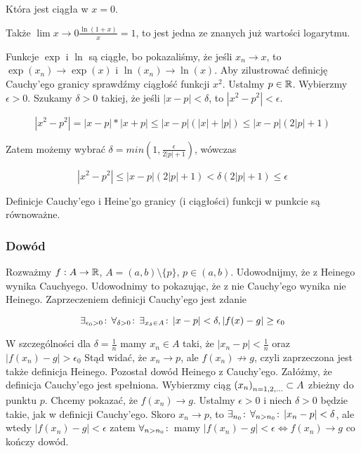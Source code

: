 \documentclass[9pt]{article}
\begin{document}
Która jest ciągła w $x = 0$.

\bigbreak

Także $\lim{x \to 0} \frac{\ln(1 + x)}{x} = 1$, to jest jedna ze znanych już wartości logarytmu.

\bigbreak

Funkcje $\exp$ i $\ln$ są ciągłe, bo pokazaliśmy, że jeśli $x_n \to x$, to $\exp(x_n) \to \exp(x)$ i
$\ln(x_n) \to \ln(x)$. Aby zilustrować definicję Cauchy'ego granicy sprawdźmy ciągłość funkcji
$x^2$. Ustalmy $p \in \mathbb{R}$. Wybierzmy $\epsilon > 0$. Szukamy $\delta > 0$ takiej, że jeśli $|x-p| <
\delta$, to $|x^2 - p^2| < \epsilon$.

\[
    |x^2 - p^2| = |x - p| * |x + p| \le |x-p| \left(|x| + |p|\right) \le |x-p| \left(2|p| + 1\right)
\]

Zatem możemy wybrać $\delta = min (1, \frac{\epsilon}{2|p| + 1})$, wówczas

\[
    |x^2 - p^2| \le |x-p|(2|p| + 1) < \delta(2|p| + 1) \le \epsilon
\]

\begin{Twi}
    Definicje Cauchy'ego i Heine'go granicy (i ciągłości) funkcji w punkcie są równoważne.
\end{Twi}

\subsubsection*{Dowód}

Rozważmy $f: A \to \mathbb{R}$, $A = (a, b) \setminus \{p\}$, $p \in (a,b)$. Udowodnijmy, że z Heinego wynika
Cauchyego. Udowodnimy to pokazując, że z nie Cauchy'ego wynika nie Heinego. Zaprzeczeniem definicji
Cauchy'ego jest zdanie

\[
    \exists_{\epsilon_0 > 0} \! : \, \forall_{\delta > 0} \! : \, \exists_{x_\delta \in A} \! : \, |x-p| < \delta, |f(x) - g| \ge
    \epsilon_0
\]

W szczególności dla $\delta = \frac{1}{n}$ mamy $x_n \in A$ taki, że $|x_n - p| < \frac{1}{n}$ oraz
$|f(x_n) - g| > \epsilon_0$ Stąd widać, że $x_n \to p$, ale $f(x_n) \not\to g$, czyli zaprzeczona
jest także definicja Heinego. Pozostał dowód Heinego z Cauchy'ego. Załóżmy, że definicja Cauchy'ego
jest spełniona. Wybierzmy ciąg $\left(x_n\right)_{n = 1,2,...} \subset A$ zbieżny do punktu $p$. Chcemy pokazać, że
$f(x_n) \to g$. Ustalmy $\epsilon > 0$ i niech $\delta > 0$ będzie takie, jak w definicji
Cauchy'ego. Skoro $x_n \to p$, to $\exists_{n_0} \! : \, \forall_{n > n_0} \! : \, |x_n - p| < \delta$, ale wtedy $|f(x_n) -
g| < \epsilon$ zatem $\forall_{n > n_0} \! : \,$ mamy $|f(x_n) - g| < \epsilon \iff f(x_n) \to g$ co kończy
dowód.
\end{document}
